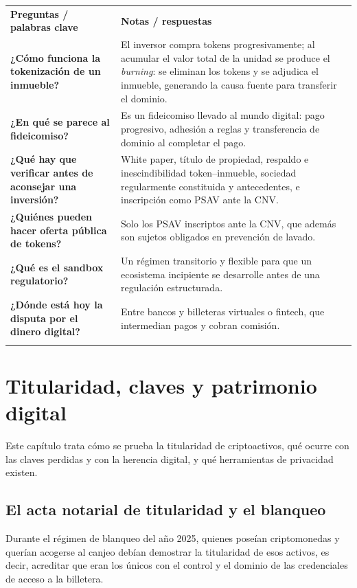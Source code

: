 \documentclass[12pt,oneside]{book}
\newcommand{\cq}[1]{\textbf{#1}}
\newcommand{\cornell}[3]{%
  \par\medskip\noindent\begingroup
  \renewcommand{\arraystretch}{1.25}%
  \begin{tabularx}{\textwidth}{|>{\raggedright\arraybackslash}p{0.27\textwidth}|>{\raggedright\arraybackslash}X|}
    \hline
    \multicolumn{2}{|>{\centering\arraybackslash}X|}{\cellcolor{azulacad!12}\textbf{Cuadro Cornell --- #1}}\\ \hline
    \cellcolor{gray!10}\textbf{Preguntas / palabras clave} & \cellcolor{gray!10}\textbf{Notas / respuestas} \\ \hline
    #2
    \multicolumn{2}{|>{\raggedright\arraybackslash}X|}{\cellcolor{azulacad!6}\textbf{Resumen.} #3}\\ \hline
  \end{tabularx}%
  \endgroup\par\medskip}
\begin{document}
\cornell{Tokenización inmobiliaria}{
\cq{¿Cómo funciona la tokenización de un inmueble?} & El inversor compra tokens progresivamente; al acumular el valor total de la unidad se produce el \emph{burning}: se eliminan los tokens y se adjudica el inmueble, generando la causa fuente para transferir el dominio. \\ \hline
\cq{¿En qué se parece al fideicomiso?} & Es un fideicomiso llevado al mundo digital: pago progresivo, adhesión a reglas y transferencia de dominio al completar el pago. \\ \hline
\cq{¿Qué hay que verificar antes de aconsejar una inversión?} & White paper, título de propiedad, respaldo e inescindibilidad token--inmueble, sociedad regularmente constituida y antecedentes, e inscripción como PSAV ante la CNV. \\ \hline
\cq{¿Quiénes pueden hacer oferta pública de tokens?} & Solo los PSAV inscriptos ante la CNV, que además son sujetos obligados en prevención de lavado. \\ \hline
\cq{¿Qué es el sandbox regulatorio?} & Un régimen transitorio y flexible para que un ecosistema incipiente se desarrolle antes de una regulación estructurada. \\ \hline
\cq{¿Dónde está hoy la disputa por el dinero digital?} & Entre bancos y billeteras virtuales o fintech, que intermedian pagos y cobran comisión. \\ \hline
}{La tokenización reproduce en clave digital la lógica del fideicomiso, con burning y adjudicación. Su seguridad depende de verificar white paper, respaldo inmobiliario, sociedad detrás y registro como PSAV ante la CNV, en un marco regulatorio todavía transitorio.}

\chapter{Titularidad, claves y patrimonio digital}
\label{cap:patrimonio}

Este capítulo trata cómo se prueba la titularidad de criptoactivos, qué ocurre con las claves perdidas y con la herencia digital, y qué herramientas de privacidad existen.

\section{El acta notarial de titularidad y el blanqueo}

Durante el régimen de blanqueo del año 2025, quienes poseían criptomonedas y querían acogerse al canjeo debían demostrar la titularidad de esos activos, es decir, acreditar que eran los únicos con el control y el dominio de las credenciales de acceso a la billetera.
\end{document}
